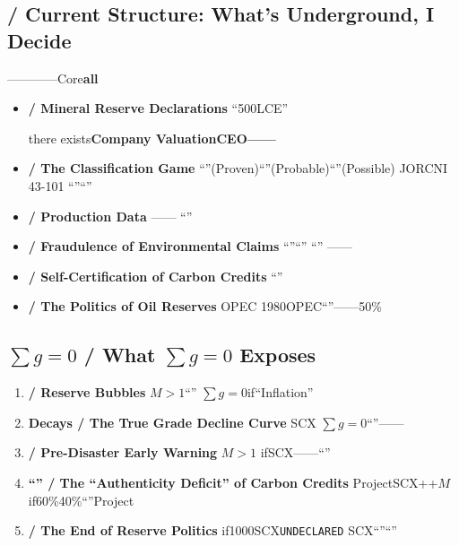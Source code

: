\documentclass[12pt,a4paper]{article}
\theoremstyle{remark}
\newcommand{\sumgeq}{\sum g = 0}
\newcommand{\undeclared}{\texttt{UNDECLARED}}
\begin{document}
\subsection{ / Current Structure: What's Underground, I Decide}

————Core\textbf{all}

\begin{itemize}[leftmargin=*]
    \item \textbf{ / Mineral Reserve Declarations}
    ``500LCE''
    
    
    there exists\textbf{Company ValuationCEO——}

    \item \textbf{ / The Classification Game}
    ``''(Proven)``''(Probable)``''(Possible)
    JORCNI 43-101
    ``''``''

    \item \textbf{ / Production Data}
    ——
    ``''

    \item \textbf{ / Fraudulence of Environmental Claims}
    ``''``''
    ``''
    ——

    \item \textbf{ / Self-Certification of Carbon Credits}
    ``''
    

    \item \textbf{ / The Politics of Oil Reserves}
    OPEC
    1980OPEC``''——50\%
    
\end{itemize}

\subsection{$\sumgeq$ / What $\sumgeq$ Exposes}

\begin{enumerate}[leftmargin=*, label=\textbf{(\arabic*)}]
    \item \textbf{ / Reserve Bubbles}
    $M>1$``''
    $\sumgeq$if``Inflation''

    \item \textbf{Decays / The True Grade Decline Curve}
    SCX
    $\sumgeq$``''——

    \item \textbf{ / Pre-Disaster Early Warning}
    $M>1$
    ifSCX——``''\textbf{}

    \item \textbf{``'' / The ``Authenticity Deficit'' of Carbon Credits}
    ProjectSCX++$M$
    if60\%40\%``''Project

    \item \textbf{ / The End of Reserve Politics}
    if1000SCX\undeclared
    SCX``''``''
\end{enumerate}
\end{document}
